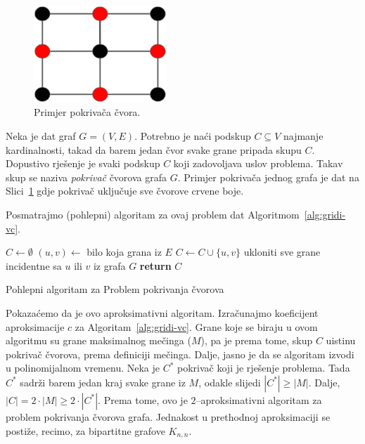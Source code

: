 \documentclass[a4paper, utf8, 11pt, colorlinks]{book}
\theoremstyle{definition}
\begin{document}
    \begin{figure}
  	\centering
  	\includegraphics[width=50mm]{vertex-cover.eps}

  	\caption{Primjer pokrivača čvora.}   	\label{fig:vertex-cover}
  \end{figure}
  Neka je dat graf $G=(V,E)$. Potrebno je naći podskup $C\subseteq V$ najmanje kardinalnosti, takad da barem jedan čvor svake grane pripada skupu $C$.  Dopustivo rješenje je svaki podskup $C$ koji zadovoljava uslov problema. Takav skup se naziva \emph{pokrivač} čvorova grafa $G$. Primjer pokrivača jednog grafa je dat na Slici~\ref{fig:vertex-cover} gdje pokrivač uključuje sve čvorove crvene boje. 
  

  
  Posmatrajmo (pohlepni) algoritam za ovaj problem dat Algoritmom~\ref{alg:gridi-vc}. 
  
  \begin{algorithm}[H] 
  	\begin{algorithmic}[1]
  		\STATE $C \gets \emptyset$
  		\STATE $(u,v) \gets$ bilo koja grana iz $E$
  		\STATE $C \gets C \cup \{u,v\}$
  		\STATE ukloniti sve grane incidentne sa  $u$ ili $v$ iz grafa $G$
  		\ENDWHILE
  		\STATE \textbf{return} $C$
  	\end{algorithmic}   
   
     \caption{Pohlepni algoritam za Problem pokrivanja čvorova}
 \label{alg:gridi-vc}
  \end{algorithm}
  
  \noindent Pokazaćemo da je ovo aproksimativni algoritam. Izračunajmo koeficijent aproksimacije $c$ za Algoritam~\ref{alg:gridi-vc}.
  Grane koje se biraju u ovom algoritmu su grane maksimalnog mečinga ($M$), pa je prema tome, skup $C$ uistinu pokrivač čvorova, prema definiciji mečinga. Dalje, jasno je da se algoritam izvodi u polinomijalnom vremenu. Neka je $C^*$ pokrivač koji je rješenje problema. Tada $C^*$ sadrži barem jedan kraj svake grane iz $M$, odakle slijedi $|C^*|\geq |M|$. Dalje, $|C|= 2 \cdot |M| \geq 2 \cdot |C^*|$. Prema tome, ovo je $2$--aproksimativni algoritam za problem pokrivanja čvorova grafa. Jednakost u prethodnoj aproksimaciji se postiže, recimo, za bipartitne grafove $K_{n,n}$. 
  
\end{document}
